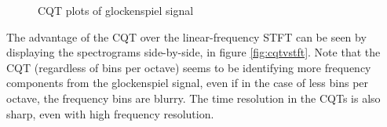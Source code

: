 \documentclass[letter,12pt,notitlepage]{article}
\begin{document}
\begin{figure}[ht]
	\vspace{0.1em}
	\hspace{0.35em}
	\hspace{0.35em}
	\caption{CQT plots of glockenspiel signal}
	\label{fig:glockcqts}
\end{figure}

The advantage of the CQT over the linear-frequency STFT can be seen by displaying the spectrograms side-by-side, in figure \ref{fig:cqtvstft}. Note that the CQT (regardless of bins per octave) seems to be identifying more frequency components from the glockenspiel signal, even if in the case of less bins per octave, the frequency bins are blurry. The time resolution in the CQTs is also sharp, even with high frequency resolution.
\end{document}
